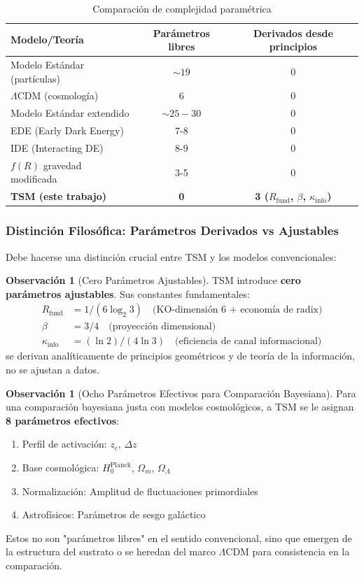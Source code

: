 \documentclass[11pt, a4paper]{article}
\theoremstyle{plain}
\theoremstyle{definition}
\newtheorem{observacion}[teorema]{Observación}
\newcommand{\Rfactor}{R_{\text{fund}}}
\newcommand{\Kinfo}{\kappa_{\text{info}}}
\begin{document}
\begin{table}[H]
\centering
\caption{Comparación de complejidad paramétrica}
\label{tab:parsimonia}
\begin{tabular}{lcc}
\toprule
\textbf{Modelo/Teoría} & \textbf{Parámetros libres} & \textbf{Derivados desde principios} \\
\midrule
Modelo Estándar (partículas) & $\sim 19$ & 0 \\
$\Lambda$CDM (cosmología) & 6 & 0 \\
Modelo Estándar extendido & $\sim 25-30$ & 0 \\
\addlinespace
EDE (Early Dark Energy) & 7-8 & 0 \\
IDE (Interacting DE) & 8-9 & 0 \\
$f(R)$ gravedad modificada & 3-5 & 0 \\
\addlinespace
\rowcolor{blue!10}
\textbf{TSM (este trabajo)} & \textbf{0} & \textbf{3 ($\Rfactor$, $\beta$, $\Kinfo$)} \\
\bottomrule
\end{tabular}
\end{table}

\subsubsection{Distinción Filosófica: Parámetros Derivados vs Ajustables}

Debe hacerse una distinción crucial entre TSM y los modelos convencionales:

\begin{observacion}[Cero Parámetros Ajustables]
TSM introduce \textbf{cero parámetros ajustables}. Sus constantes fundamentales:
\begin{align}
\Rfactor &= 1/(6\log_2 3) \quad \text{(KO-dimensión 6 + economía de radix)} \\
\beta &= 3/4 \quad \text{(proyección dimensional)} \\
\Kinfo &= (\ln 2)/(4\ln 3) \quad \text{(eficiencia de canal informacional)}
\end{align}
se derivan analíticamente de principios geométricos y de teoría de la información, no se ajustan a datos.
\end{observacion}

\begin{observacion}[Ocho Parámetros Efectivos para Comparación Bayesiana]
Para una comparación bayesiana justa con modelos cosmológicos, a TSM se le asignan \textbf{8 parámetros efectivos}:
\begin{enumerate}
    \item Perfil de activación: $z_c$, $\Delta z$
    \item Base cosmológica: $H_0^{\text{Planck}}$, $\Omega_m$, $\Omega_\Lambda$
    \item Normalización: Amplitud de fluctuaciones primordiales
    \item Astrofísicos: Parámetros de sesgo galáctico
\end{enumerate}
Estos no son "parámetros libres" en el sentido convencional, sino que emergen de la estructura del sustrato o se heredan del marco $\Lambda$CDM para consistencia en la comparación.
\end{observacion}
\end{document}
